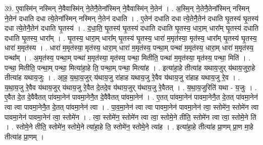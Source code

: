 \documentclass[17pt]{extarticle}
\begin{document}
39. ए॒वास्मि॑न् नस्मिन् ने॒वैवास्मि॑न् ने॒तेनै॒तेना᳚स्मिन् ने॒वैवास्मि॑न् ने॒तेन॑ । . अ॒स्मि॒न् ने॒तेनै॒तेना᳚स्मिन् नस्मिन् ने॒तेन॑ दधाति दधा त्ये॒तेना᳚स्मिन् नस्मिन् ने॒तेन॑ दधाति । . ए॒तेन॑ दधाति दधा त्ये॒तेनै॒तेन॑ दधाति घृ॒तस्य॑ घृ॒तस्य॑ दधा त्ये॒तेनै॒तेन॑ दधाति घृ॒तस्य॑ । . द॒धा॒ति॒ घृ॒तस्य॑ घृ॒तस्य॑ दधाति दधाति घृ॒तस्य॒ धारा॒म् धारा᳚म् घृ॒तस्य॑ दधाति दधाति घृ॒तस्य॒ धारा᳚म् । . घृ॒तस्य॒ धारा॒म् धारा᳚म् घृ॒तस्य॑ घृ॒तस्य॒ धारा॑ म॒मृत॑स्या॒ मृत॑स्य॒ धारा᳚म् घृ॒तस्य॑ घृ॒तस्य॒ धारा॑ म॒मृत॑स्य । . धारा॑ म॒मृत॑स्या॒ मृत॑स्य॒ धारा॒म् धारा॑ म॒मृत॑स्य॒ पन्था॒म् पन्था॑ म॒मृत॑स्य॒ धारा॒म् धारा॑ म॒मृत॑स्य॒ पन्था᳚म् । . अ॒मृत॑स्य॒ पन्था॒म् पन्था॑ म॒मृत॑स्या॒ मृत॑स्य॒ पन्था॒ मितीति॒ पन्था॑ म॒मृत॑स्या॒ मृत॑स्य॒ पन्था॒ मिति॑ । . पन्था॒ मितीति॒ पन्था॒म् पन्था॒ मित्या॑हा॒हे ति॒ पन्था॒म् पन्था॒ मित्या॑ह । . इत्या॑हा॒हे तीत्या॑ह यथाय॒जुर् य॑थाय॒जुरा॒हे तीत्या॑ह यथाय॒जुः । . आ॒ह॒ य॒था॒य॒जुर् य॑थाय॒जु रा॑हाह यथाय॒जु रे॒वैव य॑थाय॒जु रा॑हाह यथाय॒जु रे॒व । . य॒था॒य॒जु रे॒वैव य॑थाय॒जुर् य॑थाय॒जु रे॒वैत दे॒तदे॒व य॑थाय॒जुर् य॑थाय॒जु रे॒वैतत् । . य॒था॒य॒जुरिति॑ यथा - य॒जुः । . ए॒वैत दे॒त दे॒वैवैतत् पा॑वमा॒नेन॑ पावमा॒नेनै॒त दे॒वैवैतत् पा॑वमा॒नेन॑ । . ए॒तत् पा॑वमा॒नेन॑ पावमा॒नेनै॒त दे॒तत् पा॑वमा॒नेन॑ त्वा त्वा पावमा॒नेनै॒त दे॒तत् पा॑वमा॒नेन॑ त्वा । . पा॒व॒मा॒नेन॑ त्वा त्वा पावमा॒नेन॑ पावमा॒नेन॑ त्वा॒ स्तोमे॑न॒ स्तोमे॑न त्वा पावमा॒नेन॑ पावमा॒नेन॑ त्वा॒ स्तोमे॑न । . त्वा॒ स्तोमे॑न॒ स्तोमे॑न त्वा त्वा॒ स्तोमे॒ने तीति॒ स्तोमे॑न त्वा त्वा॒ स्तोमे॒ने ति॑ । . स्तोमे॒ने तीति॒ स्तोमे॑न॒ स्तोमे॒ने त्या॑हा॒हे ति॒ स्तोमे॑न॒ स्तोमे॒ने त्या॑ह । . इत्या॑हा॒हे तीत्या॑ह प्रा॒णम् प्रा॒ण मा॒हे तीत्या॑ह प्रा॒णम् । \newline
\pagebreak
{}
\end{document}
